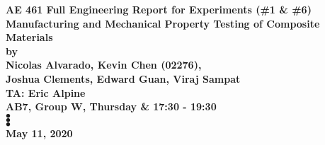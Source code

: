 \begin{titlepage}
    \begin{center}
        \vspace*{1cm}
        \large
        \textbf{AE 461 Full Engineering Report for Experiments (\#1 \& \#6)} \\
        \vspace{0.5cm}
        \textbf{Manufacturing and Mechanical Property Testing of Composite Materials} \\
        \vspace{0.5cm}
        \normalsize
        \textbf{by} \\
        \vspace{0.5cm}
        \textbf{Nicolas Alvarado, Kevin Chen (02276),\\Joshua Clements, Edward Guan, Viraj Sampat} \\
        \vspace{0.5cm}
        \textbf{TA: Eric Alpine} \\
        \vspace{0.5cm}
        \textbf{AB7, Group W, Thursday \& 17:30 - 19:30} \\

        $\bullet$\\
        \vspace{2.5cm}
        $\bullet$\\
        \vspace{2.5cm}
        $\bullet$\\
        \vspace{1.75cm}
        \textbf{May 11, 2020}
    \end{center}
\end{titlepage}